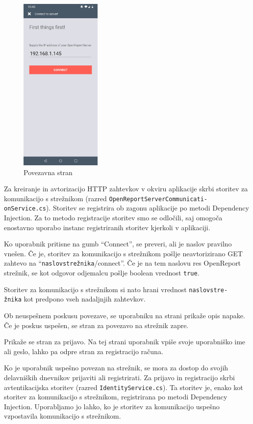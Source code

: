 \documentclass[a4paper, 12pt]{book}
\begin{document}
\begin{figure}[H]
\begin{center}
\includegraphics[width=4cm]{app_connect}
\end{center}
\caption{Povezavna stran}
\label{app_connect}
\end{figure}


Za kreiranje in avtorizacijo HTTP zahtevkov v okviru aplikacije skrbi storitev za komunikacijo s strežnikom (razred \texttt{OpenReportServerCommunicati-\\onService.cs}).
Storitev se registrira ob zagonu aplikacije po metodi Dependency Injection.
Za to metodo registracije storitev smo se odločili, saj omogoča enostavno uporabo instanc registriranih storitev kjerkoli v aplikaciji.

Ko uporabnik pritisne na gumb \enquote{Connect}, se preveri, ali je naslov pravilno vnešen.
Če je, storitev za komunikacijo s strežnikom pošlje neavtorizirano GET zahtevo na \enquote{\texttt{naslovstrežnika}/connect}. 
Če je na tem naslovu res OpenReport strežnik, se kot odgovor odjemalcu pošlje boolean vrednost \texttt{true}.

Storitev za komunikacijo s strežnikom si nato hrani vrednost \texttt{naslovstre-\\žnika} kot predpono vseh nadaljnjih zahtevkov.

Ob neuspešnem poskusu povezave, se uporabniku na strani prikaže opis napake.
Če je poskus uspešen, se stran za povezavo na strežnik zapre.

Prikaže se stran za prijavo.
Na tej strani uporabnik vpiše svoje uporabniško ime ali geslo, lahko pa odpre stran za registracijo računa.


Ko je uporabnik uspešno povezan na strežnik, se mora za dostop do svojih delavniških dnevnikov prijaviti ali registrirati.
Za prijavo in registracijo skrbi avtentikacijska storitev (razred \texttt{IdentityService.cs}).
Ta storitev je, enako kot storitev za komunikacijo s strežnikom, registrirana po metodi Dependency Injection.
Uporabljamo jo lahko, ko je storitev za komunikacijo uspešno vzpostavila komunikacijo s strežnikom.
\end{document}
